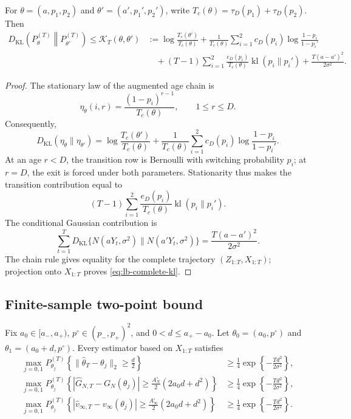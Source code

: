 \begin{lemma}
\label{lem:lb-complete-kl}
For \(\theta=(a,p_1,p_2)\) and
\(\theta'=(a',p_1',p_2')\), write
\(T_c(\theta)=\tau_D(p_1)+\tau_D(p_2)\).  Then
\begin{align}
 D_{\mathrm{KL}}\!\left(P_\theta^{(T)}\middle\|P_{\theta'}^{(T)}\right)
 \leq \mathcal K_T(\theta,\theta')
 &:=
 \log\frac{T_c(\theta')}{T_c(\theta)}
 +\frac{1}{T_c(\theta)}
 \sum_{i=1}^2c_D(p_i)
 \log\frac{1-p_i}{1-p_i'}
 \nonumber\\
 &\quad
 +(T-1)\sum_{i=1}^2
 \frac{e_D(p_i)}{T_c(\theta)}
 \operatorname{kl}(p_i\|p_i')
 +\frac{T(a-a')^2}{2\sigma^2}.
 \label{eq:lb-complete-kl}
\end{align}
\end{lemma}

\begin{proof}
The stationary law of the augmented age chain is
\[
 \eta_\theta(i,r)=
 \frac{(1-p_i)^{r-1}}{T_c(\theta)},\qquad 1\leq r\leq D.
\]
Consequently,
\[
 D_{\mathrm{KL}}(\eta_\theta\|\eta_{\theta'})
 =
 \log\frac{T_c(\theta')}{T_c(\theta)}
 +\frac{1}{T_c(\theta)}
 \sum_{i=1}^2c_D(p_i)
 \log\frac{1-p_i}{1-p_i'}.
\]
At an age \(r<D\), the transition row is Bernoulli with switching
probability \(p_i\); at \(r=D\), the exit is forced under both parameters.
Stationarity thus makes the transition contribution equal to
\[
 (T-1)\sum_{i=1}^2
 \frac{e_D(p_i)}{T_c(\theta)}
 \operatorname{kl}(p_i\|p_i').
\]
The conditional Gaussian contribution is
\[
 \sum_{t=1}^T
 D_{\mathrm{KL}}\{N(aY_t,\sigma^2)\|N(a'Y_t,\sigma^2)\}
 =\frac{T(a-a')^2}{2\sigma^2}.
\]
The chain rule gives equality for the complete trajectory
\((Z_{1:T},X_{1:T})\); projection onto \(X_{1:T}\) proves
\eqref{eq:lb-complete-kl}.
\end{proof}

\subsection{Finite-sample two-point bound}

\begin{theorem}
\label{thm:lb-two-point}
Fix \(a_0\in[a_-,a_+)\), \(p^\circ\in(p_-,p_+)^2\), and
\(0<d\leq a_+-a_0\).  Let
\(\theta_0=(a_0,p^\circ)\) and
\(\theta_1=(a_0+d,p^\circ)\).  Every estimator based on \(X_{1:T}\)
satisfies
\begin{align}
 \max_{j=0,1}
 P_{\theta_j}^{(T)}
 \left\{\|\widehat\theta_T-\theta_j\|_2\geq\frac d2\right\}
 &\geq
 \frac14\exp\!\left\{-\frac{Td^2}{2\sigma^2}\right\},
 \label{eq:lb-theta}\\
 \max_{j=0,1}
 P_{\theta_j}^{(T)}
 \left\{\left|\widehat G_{N,T}-G_N(\theta_j)\right|
 \geq\frac{A_N^\circ}{2}(2a_0d+d^2)\right\}
 &\geq
 \frac14\exp\!\left\{-\frac{Td^2}{2\sigma^2}\right\},
 \label{eq:lb-GN}\\
 \max_{j=0,1}
 P_{\theta_j}^{(T)}
 \left\{\left|\widehat v_{\infty,T}-v_\infty(\theta_j)\right|
 \geq\frac{A_\infty^\circ}{2}(2a_0d+d^2)\right\}
 &\geq
 \frac14\exp\!\left\{-\frac{Td^2}{2\sigma^2}\right\}.
 \label{eq:lb-vinfty}
\end{align}
\end{theorem}

